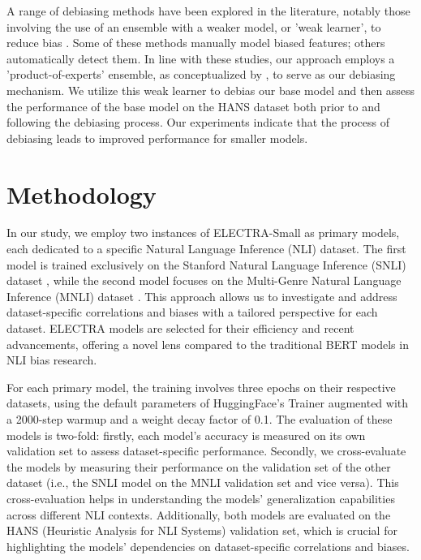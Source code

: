 \documentclass[11pt,a4paper]{article}
\begin{document}
A range of debiasing methods have been explored in the literature, notably those involving the use of an ensemble with a weaker model, or 'weak learner', to reduce bias \cite{mccoy2019right,clark2019dont,utama2020debiasing}. Some of these methods manually model biased features; others automatically detect them. In line with these studies, our approach employs a 'product-of-experts' ensemble, as conceptualized by \citet{hinton2002training}, to serve as our debiasing mechanism. We utilize this weak learner to debias our base model and then assess the performance of the base model on the HANS dataset both prior to and following the debiasing process. Our experiments indicate that the process of debiasing leads to improved performance for smaller models. 

\section{Methodology}
In our study, we employ two instances of ELECTRA-Small as primary models, each dedicated to a specific Natural Language Inference (NLI) dataset. The first model is trained exclusively on the Stanford Natural Language Inference (SNLI) dataset \cite{bowman2015large}, while the second model focuses on the Multi-Genre Natural Language Inference (MNLI) dataset \cite{williams2018broadcoverage}. This approach allows us to investigate and address dataset-specific correlations and biases with a tailored perspective for each dataset. ELECTRA models are selected for their efficiency and recent advancements, offering a novel lens compared to the traditional BERT models in NLI bias research.

For each primary model, the training involves three epochs on their respective datasets, using the default parameters of HuggingFace's Trainer augmented with a 2000-step warmup and a weight decay factor of 0.1. The evaluation of these models is two-fold: firstly, each model's accuracy is measured on its own validation set to assess dataset-specific performance. Secondly, we cross-evaluate the models by measuring their performance on the validation set of the other dataset (i.e., the SNLI model on the MNLI validation set and vice versa). This cross-evaluation helps in understanding the models' generalization capabilities across different NLI contexts. Additionally, both models are evaluated on the HANS (Heuristic Analysis for NLI Systems) validation set, which is crucial for highlighting the models' dependencies on dataset-specific correlations and biases.
\end{document}

